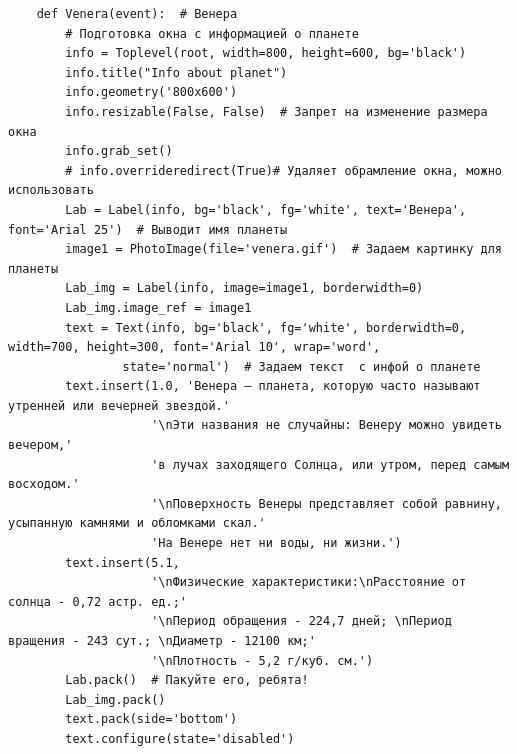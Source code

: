 \documentclass[11pt,a4paper]{report}
\begin{document}
\begin{verbatim}
    def Venera(event):  # Венера
        # Подготовка окна с информацией о планете
        info = Toplevel(root, width=800, height=600, bg='black')
        info.title("Info about planet")
        info.geometry('800x600')
        info.resizable(False, False)  # Запрет на изменение размера окна
        info.grab_set()
        # info.overrideredirect(True)# Удаляет обрамление окна, можно использовать
        Lab = Label(info, bg='black', fg='white', text='Венера', font='Arial 25')  # Выводит имя планеты
        image1 = PhotoImage(file='venera.gif')  # Задаем картинку для планеты
        Lab_img = Label(info, image=image1, borderwidth=0)
        Lab_img.image_ref = image1
        text = Text(info, bg='black', fg='white', borderwidth=0, width=700, height=300, font='Arial 10', wrap='word',
                state='normal')  # Задаем текст  с инфой о планете
        text.insert(1.0, 'Венера — планета, которую часто называют утренней или вечерней звездой.'
                    '\nЭти названия не случайны: Венеру можно увидеть вечером,'
                    'в лучах заходящего Солнца, или утром, перед самым восходом.'
                    '\nПоверхность Венеры представляет собой равнину, усыпанную камнями и обломками скал.'
                    'На Венере нет ни воды, ни жизни.')
        text.insert(5.1,
                    '\nФизические характеристики:\nРасстояние от солнца - 0,72 астр. ед.;'
                    '\nПериод обращения - 224,7 дней; \nПериод вращения - 243 сут.; \nДиаметр - 12100 км;'
                    '\nПлотность - 5,2 г/куб. см.')
        Lab.pack()  # Пакуйте его, ребята!
        Lab_img.pack()
        text.pack(side='bottom')
        text.configure(state='disabled')


\end{verbatim}
\end{document}
